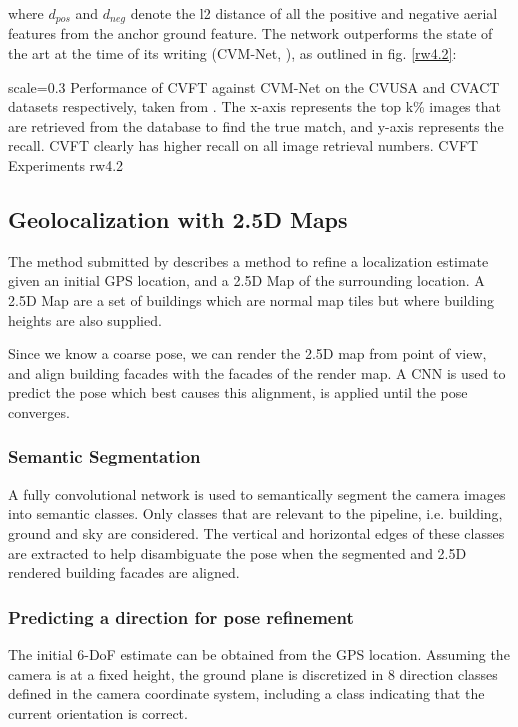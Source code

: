 where $d_{pos}$ and $d_{neg}$ denote the l2 distance of all the positive and negative aerial features from the anchor ground feature. The network outperforms the state of the art at the time of its writing (CVM-Net, \cite{Hu2018}), as outlined in fig. \ref{rw4.2}:


{scale=0.3}%
{Performance of CVFT against CVM-Net on the CVUSA and CVACT datasets respectively, taken from \cite{Shi2019}. The x-axis represents the top k\% images that are retrieved from the database to find the true match, and y-axis represents the recall. CVFT clearly has higher recall on all image retrieval numbers.}%
{CVFT Experiments}%
{rw4.2} %

\newpage
\subsection{Geolocalization with 2.5D Maps}
The method submitted by \cite{armagan2017} describes a method to refine a localization estimate given an initial GPS location, and a 2.5D Map of the surrounding location. A 2.5D Map are a set of buildings which are normal map tiles but where building heights are also supplied. 

Since we know a coarse pose, we can render the 2.5D map from point of view, and align building facades with the facades of the render map. A CNN is used to predict the pose which best causes this alignment, is applied until the pose converges. 

\subsubsection{Semantic Segmentation}
A fully convolutional network is used to semantically segment the camera images into semantic classes. Only classes that are relevant to the pipeline, i.e. building, ground and sky are considered. The vertical and horizontal edges of these classes are extracted to help disambiguate the pose when the segmented and 2.5D rendered building facades are aligned.

\subsubsection{Predicting a direction for pose refinement}
The initial 6-DoF estimate can be obtained from the GPS location. Assuming the camera is at a fixed height, the ground plane is discretized in 8 direction classes defined in the camera coordinate system, including a class indicating that the current orientation is correct.

